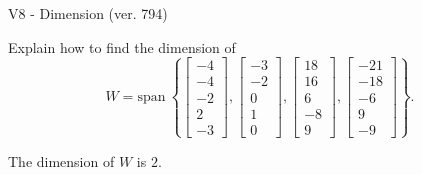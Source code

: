 \begin{exercise}
  \begin{exerciseTitle}V8 - Dimension (ver. 794)\end{exerciseTitle}
  \begin{exerciseStatement}
    Explain how to find the dimension of 
\[W=\mathrm{span}\ \left\{\left[\begin{array}{r}
-4 \\
-4 \\
-2 \\
2 \\
-3
\end{array}\right] , \left[\begin{array}{r}
-3 \\
-2 \\
0 \\
1 \\
0
\end{array}\right] , \left[\begin{array}{r}
18 \\
16 \\
6 \\
-8 \\
9
\end{array}\right] , \left[\begin{array}{r}
-21 \\
-18 \\
-6 \\
9 \\
-9
\end{array}\right]\right\}.\]



  \end{exerciseStatement}
  \begin{exerciseAnswer}
   The dimension of \(W\) is  \(2\).
  


  \end{exerciseAnswer}
\end{exercise}